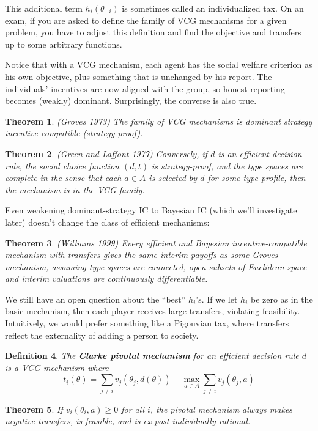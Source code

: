 \documentclass[letter, 10pt]{article}
\newtheorem{theorem}{Theorem}[section]
\newtheorem{definition}[theorem]{Definition}
\theoremstyle{definition}
\begin{document}
\begin{spacing}{1.1}
This additional term $h_i(\theta_{-i})$ is sometimes called an
individualized tax. On an exam, if you are asked to define the family of
VCG mechanisms for a given problem, you have to adjust this definition and
find the objective and transfers up to some arbitrary functions.

Notice that with a VCG mechanism, each agent has the social welfare
criterion as his own objective, plus something that is unchanged by his
report. The individuals' incentives are now aligned with the group, so
honest reporting becomes (weakly) dominant. Surprisingly, the converse is
also true.
\begin{theorem}
  (Groves 1973) The family of VCG mechanisms is dominant strategy incentive
  compatible (strategy-proof).
\end{theorem}
\begin{theorem}
  (Green and Laffont 1977) Conversely, if $d$ is an efficient decision
  rule, the social choice function $(d,t)$ is strategy-proof, and the type
  spaces are complete in the sense that each $a \in A$ is selected by $d$
  for some type profile, then the mechanism is in the VCG family.
\end{theorem}
Even weakening dominant-strategy IC to Bayesian IC (which we'll investigate
later) doesn't change the class of efficient mechanisms:
\begin{theorem}
  (Williams 1999) Every efficient and Bayesian incentive-compatible
  mechanism with transfers gives the same interim payoffs as some Groves
  mechanism, assuming type spaces are connected, open subsets of Euclidean
  space and interim valuations are continuously differentiable.
\end{theorem}

We still have an open question about the ``best'' $h_i$'s. If we let $h_i$
be zero as in the basic mechanism, then each player receives large
transfers, violating feasibility. Intuitively, we would prefer something
like a Pigouvian tax, where transfers reflect the externality of adding a
person to society.

\begin{definition}
  The \textbf{Clarke pivotal mechanism} for an efficient decision rule $d$
  is a VCG mechanism where \[t_i(\theta) = \sum_{j \neq i} v_j(\theta_j,
  d(\theta)) - \max_{a\in A} \sum_{j\neq i} v_j(\theta_j, a)\]
\end{definition}

\begin{theorem}
  If $v_i(\theta_i,a)\geq 0$ for all $i$, the pivotal mechanism always
  makes negative transfers, is feasible, and is ex-post individually
  rational.
\end{theorem}


\end{spacing}
\end{document}

